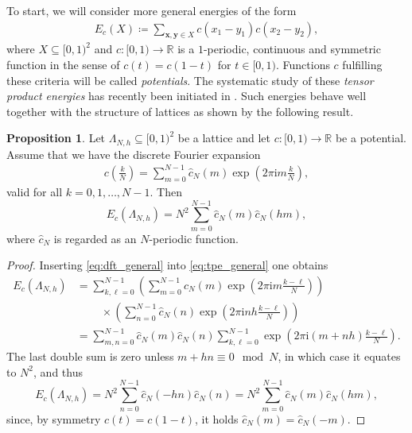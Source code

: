 \documentclass[]{interact}
\newcommand{\bx}{\mathbf{x}}
\newcommand{\by}{\mathbf{y}}
\newcommand{\bbR}{\mathbb{R}}
\newcommand{\ra}{\rightarrow}
\newcommand{\sbse}{\subseteq}
\newcommand{\iu}{\mathrm{i}}
\theoremstyle{definition}
\newtheorem{prop}[thm]{Proposition}
\numberwithin{table}{section} %
\numberwithin{figure}{section}
\begin{document}
To start, we will consider more general energies of the form
\begin{align} \label{eq:tpe_general}
    E_c(X) \coloneqq \sum_{\bx, \by \in X} c(x_1-y_1) c(x_2-y_2),
\end{align}
where $X \sbse [0, 1)^2$ and $c: [0, 1) \ra \bbR$ is a $1$-periodic, continuous and symmetric function in the sense of $c(t) = c(1-t)$ for $t \in [0, 1)$. Functions $c$ fulfilling these criteria will be called \emph{potentials}. The systematic study of these \emph{tensor product energies} has recently been initiated in \cite{BNR25, Nag25, Nag26}. Such energies behave well together with the structure of lattices as shown by the following result.

\begin{prop} \label{prop:dft_sum}
    Let $\Lambda_{N, h} \sbse [0, 1)^2$ be a lattice and let $c: [0, 1) \ra \bbR$ be a potential. Assume that we have the discrete Fourier expansion
    \begin{align} \label{eq:dft_general}
        c\left(\frac kN\right) = \sum_{m=0}^{N-1} \hat c_N(m) \exp\left(2\pi\iu m\frac{k}{N}\right),
    \end{align}
    valid for all $k = 0, 1, \dots, N-1$. Then
    $$
    E_c(\Lambda_{N, h}) = N^2 \sum_{m=0}^{N-1} \hat c_N(m) \hat c_N(hm),
    $$
    where $\hat c_N$ is regarded as an $N$-periodic function.
\end{prop}
\begin{proof}
    Inserting \eqref{eq:dft_general} into \eqref{eq:tpe_general} one obtains
    \begin{align*}
        E_c(\Lambda_{N, h}) & = \sum_{k, \ell = 0}^{N-1} \left(\sum_{m=0}^{N-1} \hat c_N(m) \exp\left(2\pi\iu m\frac{k-\ell}{N}\right)\right) \\
        & ~~~~~~~~~~ \times \left(\sum_{n=0}^{N-1} \hat c_N(n) \exp\left(2\pi\iu nh\frac{k-\ell}{N}\right)\right) \\
        & = \sum_{m, n = 0}^{N-1} \hat c_N(m) \hat c_N(n) \sum_{k, \ell = 0}^{N-1} \exp\left(2\pi\iu (m+nh)\frac{k-\ell}{N}\right).
    \end{align*}
    The last double sum is zero unless $m+hn \equiv 0 \mod N$, in which case it equates to $N^2$, and thus
    $$
    E_c(\Lambda_{N, h}) = N^2 \sum_{n = 0}^{N-1} \hat c_N(-hn) \hat c_N(n) = N^2 \sum_{m=0}^{N-1} \hat c_N(m) \hat c_N(hm),
    $$
    since, by symmetry $c(t) = c(1-t)$, it holds $\hat c_N(m) = \hat c_N(-m)$.
\end{proof}
\end{document}

